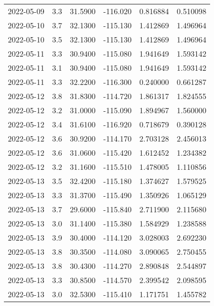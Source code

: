 \begin{tabular}{lrrrrr}
2022-05-09 &       3.3 &  31.5900 &  -116.020 &         0.816884 &         0.510098 \\
2022-05-10 &       3.7 &  32.1300 &  -115.130 &         1.412869 &         1.496964 \\
2022-05-10 &       3.5 &  32.1300 &  -115.130 &         1.412869 &         1.496964 \\
2022-05-11 &       3.3 &  30.9400 &  -115.080 &         1.941649 &         1.593142 \\
2022-05-11 &       3.1 &  30.9400 &  -115.080 &         1.941649 &         1.593142 \\
2022-05-11 &       3.3 &  32.2200 &  -116.300 &         0.240000 &         0.661287 \\
2022-05-12 &       3.8 &  31.8300 &  -114.720 &         1.861317 &         1.824555 \\
2022-05-12 &       3.2 &  31.0000 &  -115.090 &         1.894967 &         1.560000 \\
2022-05-12 &       3.4 &  31.6100 &  -116.920 &         0.718679 &         0.390128 \\
2022-05-12 &       3.6 &  30.9200 &  -114.170 &         2.703128 &         2.456013 \\
2022-05-12 &       3.6 &  31.0600 &  -115.420 &         1.612452 &         1.234382 \\
2022-05-12 &       3.2 &  31.1600 &  -115.510 &         1.478005 &         1.110856 \\
2022-05-13 &       3.5 &  32.4200 &  -115.180 &         1.374627 &         1.579525 \\
2022-05-13 &       3.3 &  31.3700 &  -115.490 &         1.350926 &         1.065129 \\
2022-05-13 &       3.7 &  29.6000 &  -115.840 &         2.711900 &         2.115680 \\
2022-05-13 &       3.0 &  31.1400 &  -115.380 &         1.584929 &         1.238588 \\
2022-05-13 &       3.9 &  30.4000 &  -114.120 &         3.028003 &         2.692230 \\
2022-05-13 &       3.8 &  30.3500 &  -114.080 &         3.090065 &         2.750455 \\
2022-05-13 &       3.8 &  30.4300 &  -114.270 &         2.890848 &         2.544897 \\
2022-05-13 &       3.3 &  30.8500 &  -114.570 &         2.399542 &         2.098595 \\
2022-05-13 &       3.0 &  32.5300 &  -115.410 &         1.171751 &         1.455782 \\

\end{tabular}

